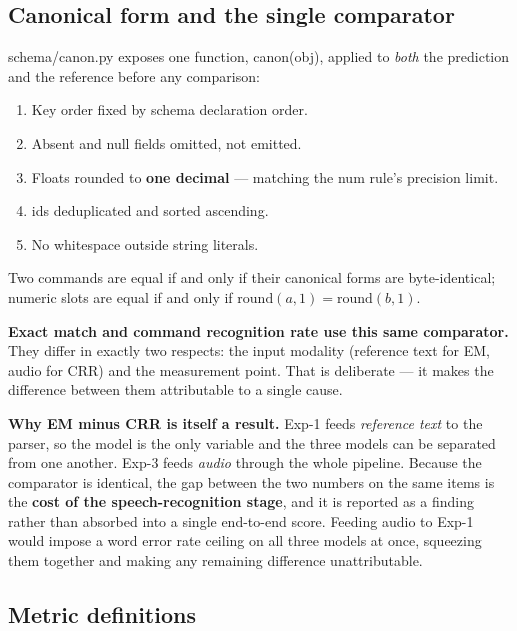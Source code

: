 \documentclass[11pt,a4paper]{article}
\newcommand{\code}[1]{{\ttfamily\small #1}}
\newenvironment{panel}
  {\par\begin{center}\begin{lrbox}{\panelbox}\begin{minipage}{0.94\textwidth}\vspace{3pt}}
  {\vspace{3pt}\end{minipage}\end{lrbox}%
   \fcolorbox{rulegray}{panelbg}{\usebox{\panelbox}}\end{center}\par}
\begin{document}
\subsection{Canonical form and the single comparator}

\code{schema/canon.py} exposes one function, \code{canon(obj)}, applied to \emph{both} the prediction and
the reference before any comparison:

\begin{enumerate}[leftmargin=1.6em,itemsep=2pt,topsep=3pt]
  \item Key order fixed by schema declaration order.
  \item Absent and null fields omitted, not emitted.
  \item Floats rounded to \textbf{one decimal} --- matching the \code{num} rule's precision limit.
  \item \code{ids} deduplicated and sorted ascending.
  \item No whitespace outside string literals.
\end{enumerate}

Two commands are equal if and only if their canonical forms are byte-identical; numeric slots are equal if
and only if $\mathrm{round}(a,1) = \mathrm{round}(b,1)$.

\textbf{Exact match and command recognition rate use this same comparator.} They differ in exactly two
respects: the input modality (reference text for EM, audio for CRR) and the measurement point. That is
deliberate --- it makes the difference between them attributable to a single cause.

\begin{panel}
\textbf{Why EM minus CRR is itself a result.} Exp-1 feeds \emph{reference text} to the parser, so the
model is the only variable and the three models can be separated from one another. Exp-3 feeds
\emph{audio} through the whole pipeline. Because the comparator is identical, the gap between the two
numbers on the same items is the \textbf{cost of the speech-recognition stage}, and it is reported as a
finding rather than absorbed into a single end-to-end score. Feeding audio to Exp-1 would impose a word
error rate ceiling on all three models at once, squeezing them together and making any remaining
difference unattributable.
\end{panel}

\subsection{Metric definitions}
\end{document}

